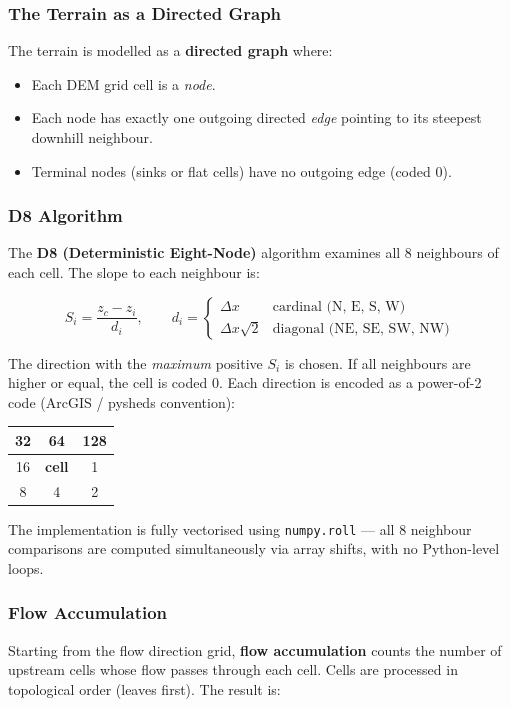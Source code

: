 \documentclass[12pt,a4paper]{article}
\begin{document}
\subsubsection{The Terrain as a Directed Graph}
The terrain is modelled as a \textbf{directed graph} where:
\begin{itemize}
    \item Each DEM grid cell is a \emph{node}.
    \item Each node has exactly one outgoing directed \emph{edge} pointing to its steepest
          downhill neighbour.
    \item Terminal nodes (sinks or flat cells) have no outgoing edge (coded 0).
\end{itemize}

\subsubsection{D8 Algorithm}
The \textbf{D8 (Deterministic Eight-Node)} algorithm examines all 8 neighbours of each
cell. The slope to each neighbour is:

\begin{equation}
    S_i = \frac{z_c - z_i}{d_i}, \qquad
    d_i = \begin{cases}
        \Delta x          & \text{cardinal (N, E, S, W)} \\
        \Delta x \sqrt{2} & \text{diagonal (NE, SE, SW, NW)}
    \end{cases}
\end{equation}

The direction with the \emph{maximum} positive $S_i$ is chosen. If all neighbours are
higher or equal, the cell is coded 0. Each direction is encoded as a power-of-2 code
(ArcGIS / pysheds convention):

\begin{center}
\begin{tabular}{|c|c|c|}
    \hline
    32 & 64 & 128 \\
    \hline
    16 & \textbf{cell} & 1 \\
    \hline
    8  & 4  & 2 \\
    \hline
\end{tabular}
\end{center}

The implementation is fully vectorised using \texttt{numpy.roll} --- all 8 neighbour
comparisons are computed simultaneously via array shifts, with no Python-level loops.

\subsubsection{Flow Accumulation}
Starting from the flow direction grid, \textbf{flow accumulation} counts the number of
upstream cells whose flow passes through each cell. Cells are processed in
topological order (leaves first). The result is:
\end{document}
